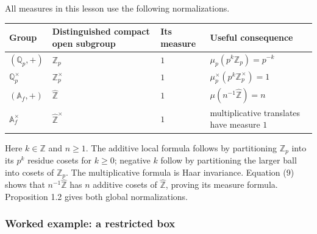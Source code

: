 \documentclass[
  english,
  11pt,
  a4paper,
]{article}
\newcounter{none} %
\begin{document}
All measures in this lesson use the following normalizations.

{\def\LTcaptype{none} %
\begin{longtable}[]{@{}
  >{\raggedright\arraybackslash}p{}
  >{\raggedright\arraybackslash}p{}
  >{\raggedleft\arraybackslash}p{}
  >{\raggedright\arraybackslash}p{}@{}}
\toprule\noalign{}
\begin{minipage}[b]{\linewidth}\raggedright
Group
\end{minipage} & \begin{minipage}[b]{\linewidth}\raggedright
Distinguished compact open subgroup
\end{minipage} & \begin{minipage}[b]{\linewidth}\raggedleft
Its measure
\end{minipage} & \begin{minipage}[b]{\linewidth}\raggedright
Useful consequence
\end{minipage} \\
\midrule\noalign{}
\endhead
\bottomrule\noalign{}
\endlastfoot
\((\mathbb Q_p,+)\) & \(\mathbb Z_p\) & \(1\) &
\(\mu_p(p^k\mathbb Z_p)=p^{-k}\) \\
\(\mathbb Q_p^\times\) & \(\mathbb Z_p^\times\) & \(1\) &
\(\mu_p^\times(p^k\mathbb Z_p^\times)=1\) \\
\((\mathbb A_f,+)\) & \(\widehat{\mathbb Z}\) & \(1\) &
\(\mu(n^{-1}\widehat{\mathbb Z})=n\) \\
\(\mathbb A_f^\times\) & \(\widehat{\mathbb Z}^\times\) & \(1\) &
multiplicative translates have measure \(1\) \\
\end{longtable}
}

Here \(k\in\mathbb Z\) and \(n\geq1\). The additive local formula
follows by partitioning \(\mathbb Z_p\) into its \(p^k\) residue cosets
for \(k\geq0\); negative \(k\) follow by partitioning the larger ball
into cosets of \(\mathbb Z_p\). The multiplicative formula is Haar
invariance. Equation (9) shows that \(n^{-1}\widehat{\mathbb Z}\) has
\(n\) additive cosets of \(\widehat{\mathbb Z}\), proving its measure
formula. Proposition 1.2 gives both global normalizations.

\subsubsection{Worked example: a restricted
box}\label{NT-ADL-01--worked-example-a-restricted-box}
\end{document}
